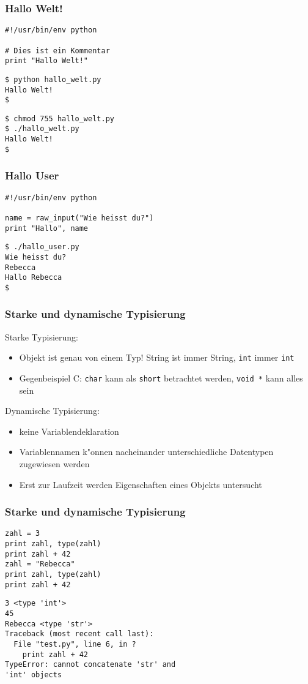 \begin{frame}[fragile]
\frametitle{Hallo Welt!}
\begin{lstlisting}[style=Python]
#!/usr/bin/env python

# Dies ist ein Kommentar
print "Hallo Welt!"
\end{lstlisting}
\begin{lstlisting}[style=Shell]
$ python hallo_welt.py
Hallo Welt!
$
\end{lstlisting}%
\begin{lstlisting}[style=Shell]
$ chmod 755 hallo_welt.py
$ ./hallo_welt.py
Hallo Welt!
$
\end{lstlisting} %
\end{frame}

\begin{frame}[fragile]
\frametitle{Hallo User}
\begin{lstlisting}[style=Python]
#!/usr/bin/env python

name = raw_input("Wie heisst du?")
print "Hallo", name
\end{lstlisting}
\begin{lstlisting}[style=Shell]
$ ./hallo_user.py
Wie heisst du?
Rebecca
Hallo Rebecca
$
\end{lstlisting}
\end{frame}

\begin{frame}
\frametitle{Starke und dynamische Typisierung}
\alert{Starke Typisierung:}
\begin{itemize}
\item Objekt ist genau von einem Typ! String ist immer String, \texttt{int} immer \texttt{int}
\item Gegenbeispiel C: \texttt{char} kann als \texttt{short} betrachtet werden, \texttt{void~*} kann alles sein
\end{itemize}
\alert{Dynamische Typisierung: }
\begin{itemize}
\item keine Variablendeklaration
\item Variablennamen k"onnen nacheinander unterschiedliche Datentypen zugewiesen werden
\item Erst zur Laufzeit werden Eigenschaften eines Objekts untersucht
\end{itemize}
\end{frame}

\begin{frame}[fragile]
\frametitle{Starke und dynamische Typisierung}
\begin{lstlisting}[style=Python]
zahl = 3
print zahl, type(zahl)
print zahl + 42
zahl = "Rebecca"
print zahl, type(zahl)
print zahl + 42
\end{lstlisting}
\begin{lstlisting}[style=Shell]
3 <type 'int'>
45
Rebecca <type 'str'>
Traceback (most recent call last):
  File "test.py", line 6, in ?
    print zahl + 42
TypeError: cannot concatenate 'str' and 
'int' objects
\end{lstlisting}
\end{frame}


